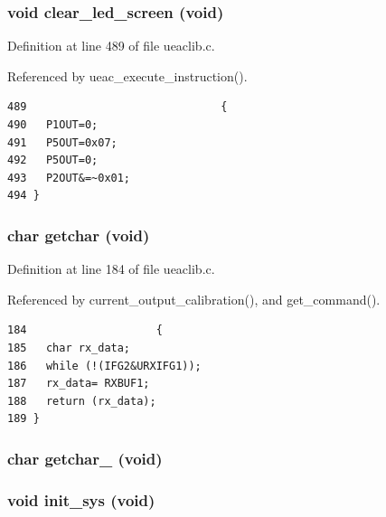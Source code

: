 \subsubsection{\setlength{\rightskip}{0pt plus 5cm}void clear\_\-led\_\-screen (void)}\label{ueaclib_8h_a21}




Definition at line 489 of file ueaclib.c.

Referenced by ueac\_\-execute\_\-instruction().

\footnotesize\begin{verbatim}489                              {
490   P1OUT=0;
491   P5OUT=0x07;
492   P5OUT=0;
493   P2OUT&=~0x01;
494 }
\end{verbatim}\normalsize 


\subsubsection{\setlength{\rightskip}{0pt plus 5cm}char getchar (void)}\label{ueaclib_8h_a10}




Definition at line 184 of file ueaclib.c.

Referenced by current\_\-output\_\-calibration(), and get\_\-command().

\footnotesize\begin{verbatim}184                    {
185   char rx_data;
186   while (!(IFG2&URXIFG1));
187   rx_data= RXBUF1;
188   return (rx_data);
189 }
\end{verbatim}\normalsize 


\subsubsection{\setlength{\rightskip}{0pt plus 5cm}char getchar\_ (void)}\label{ueaclib_8h_a8}


\subsubsection{\setlength{\rightskip}{0pt plus 5cm}void init\_\-sys (void)}\label{ueaclib_8h_a6}





